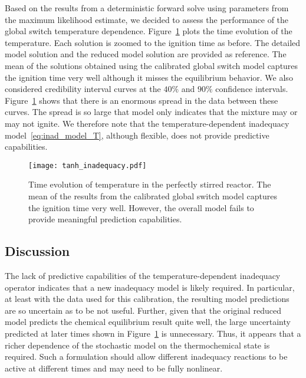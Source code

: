 \documentclass[fontsize=12pt, %
               paper=a4, %
               hyperref]{report}
\begin{document}
  Based on the results from a deterministic forward solve using parameters from the 
  maximum likelihood estimate, we decided to assess the performance of the global switch 
  temperature dependence.  Figure~\ref{fig:tanh_inadequacy} plots the time evolution of the 
  temperature.  Each solution is zoomed to the ignition time as before.  The 
  detailed model solution and the reduced model solution are provided as reference.  
  The mean of the solutions obtained using the calibrated global switch model 
  captures the ignition time very well although it misses the equilibrium behavior.  
  We also considered credibility interval curves at the $40\%$ and $90\%$ confidence 
  intervals.  Figure~\ref{fig:tanh_inadequacy} shows that there is an enormous spread in the 
  data between these curves.  The spread is so large that model only indicates that 
  the mixture may or may not ignite.  We therefore note that the temperature-dependent 
  inadequacy model~\eqref{eq:inad_model_T}, although flexible, does not provide predictive 
  capabilities.
  \begin{figure}[h!]
    \centering
    \texttt{[image: tanh\_inadequacy.pdf]}
    \caption{Time evolution of temperature in the perfectly stirred reactor. 
             The mean of the results from the calibrated global switch model 
             captures the ignition time very well.  However, the overall 
             model fails to provide meaningful prediction capabilities.}
    \label{fig:tanh_inadequacy}
  \end{figure}


  \subsection{Discussion} \label{sec:discuss1}
  The lack of predictive capabilities of the temperature-dependent
  inadequacy operator indicates that a new inadequacy model is likely
  required.  In particular, at least with the data used for this
  calibration, the resulting model predictions are so uncertain as to be
  not useful.  Further, given that the original reduced model predicts
  the chemical equilibrium result quite well, the large uncertainty
  predicted at later times shown in Figure~\ref{fig:tanh_inadequacy} is
  unnecessary.  Thus, it appears that a richer dependence of the
  stochastic model on the thermochemical state is required.  Such a
  formulation should allow different inadequacy reactions to be active
  at different times and may need to be fully nonlinear.
\end{document}
